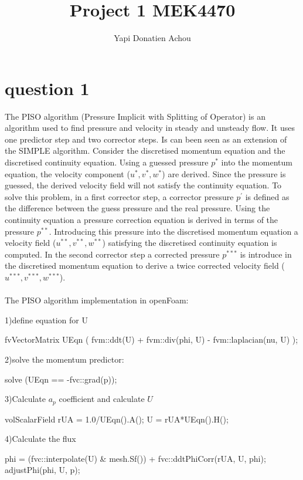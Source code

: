 \documentclass[10pt,a4paper]{report}
\author{Yapi Donatien Achou}
\title{Project 1 MEK4470}
\begin{document}
\section{question 1}

The PISO algorithm (Pressure Implicit with Splitting of Operator) is an algorithm used to find pressure and velocity in steady and unsteady flow.
It uses one predictor step and two corrector steps. Is can been seen as an extension of the SIMPLE algorithm. Consider the discretised momentum equation and the discretised continuity equation. Using a guessed pressure $p^{*}$ into the momentum equation, the velocity component ($u^{*}, v^{*}, w^{*}$) are derived. Since the pressure is guessed, the derived velocity field will not satisfy the continuity equation. To solve this problem, in a first corrector step,  a corrector pressure $p^{\prime}$ is defined as the difference between the guess pressure and the real pressure. Using the continuity equation a pressure correction equation is derived in terms of the pressure $p^{**}$. Introducing this pressure into the discretised momentum equation a velocity field ($u^{**}, v^{**}, w^{**}$) satisfying the discretised continuity equation is computed. In the second corrector step a corrected pressure $p^{***}$ is introduce in the discretised momentum equation to derive a twice corrected velocity field ($u^{***}, v^{***}, w^{***}$).\\
\\
The PISO algorithm implementation in openFoam:

1)define equation for U
\begin{code}

 fvVectorMatrix UEqn
 (
   	fvm::ddt(U)
      + fvm::div(phi, U)
      - fvm::laplacian(nu, U)
 );
\end{code}

2)solve the momentum predictor:
\begin{code}
solve (UEqn == -fvc::grad(p));
\end{code}

3)Calculate $a_{p}$ coefficient and calculate $U$
\begin{code}
volScalarField rUA = 1.0/UEqn().A();
 U = rUA*UEqn().H();
\end{code}

4)Calculate the flux
\begin{code}
phi = (fvc::interpolate(U) & mesh.Sf()) 
       + fvc::ddtPhiCorr(rUA, U, phi);
 adjustPhi(phi, U, p);
\end{code}
\end{document}

